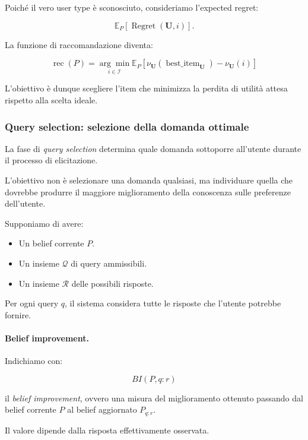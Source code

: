 Poiché il vero user type è sconosciuto, consideriamo l'expected regret:

\[
\mathbb{E}_P[
\operatorname{Regret}(\mathbf{U},i)
].
\]

La funzione di raccomandazione diventa:

\[
\boxed{
\operatorname{rec}(P)
=
\underset{i\in\mathcal{I}}{\arg\min}
\mathbb{E}_P
\left[
\nu_{\mathbf{U}}
(\operatorname{best\_item}_{\mathbf{U}})
-
\nu_{\mathbf{U}}(i)
\right]
}
\]

L'obiettivo è dunque scegliere l'item che minimizza la perdita di utilità attesa rispetto alla scelta ideale.

\newpage

\subsubsection{Query selection: selezione della domanda ottimale}

La fase di \textit{query selection} determina quale domanda sottoporre all'utente durante il processo di elicitazione.

L'obiettivo non è selezionare una domanda qualsiasi, ma individuare quella che dovrebbe produrre il maggiore miglioramento della conoscenza sulle preferenze dell'utente.

Supponiamo di avere:

\begin{itemize}
    \item Un belief corrente $P$.
    \item Un insieme $\mathcal{Q}$ di query ammissibili.
    \item Un insieme $\mathcal{R}$ delle possibili risposte.
\end{itemize}

Per ogni query $q$, il sistema considera tutte le risposte che l'utente potrebbe fornire.

\paragraph{Belief improvement.}

Indichiamo con:

\[
BI(P,q:r)
\]

il \textit{belief improvement}, ovvero una misura del miglioramento ottenuto passando dal belief corrente $P$ al belief aggiornato $P_{q:r}$.

Il valore dipende dalla risposta effettivamente osservata.

